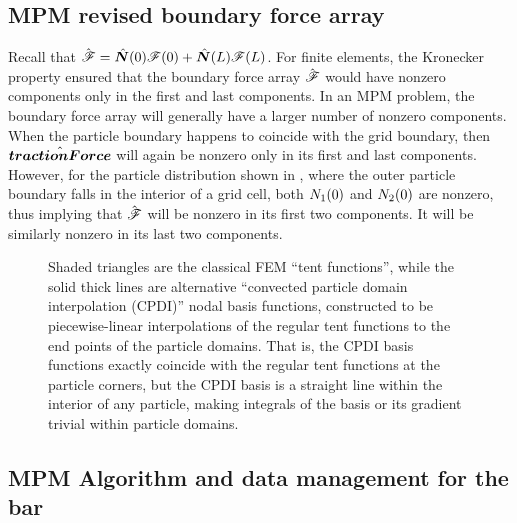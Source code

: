 \subsection{MPM revised boundary force array}
Recall that $\hat{\bm{\mathscr{F}}}=\hat{\bm{N}}(0)\mathscr{F}(0)+\hat{\bm{N}}(L)\mathscr{F}(L)$.  For finite elements, the Kronecker property ensured that the boundary force array $\hat{\bm{\mathscr{F}}}$ would have nonzero components only in the first and last components. In an MPM problem, the boundary force array will generally have a larger number of nonzero components.  When the particle boundary happens to coincide with the grid boundary, then $\hat{\bm{tractionForce}}$ will again be nonzero only in its first and last components.  However, for the particle distribution shown in , where the outer particle boundary falls in the interior of a grid cell, both ${N}_1(0)$ and ${N}_2(0)$ are nonzero, thus implying that $\hat{\bm{\mathscr{F}}}$ will be nonzero in its first two components. It will be similarly nonzero in its last two components. 



\begin{figure}
\caption{Shaded triangles are the classical FEM ``tent functions'', while the solid thick lines are alternative ``convected particle domain interpolation (CPDI)'' nodal basis functions, constructed to be piecewise-linear interpolations of the regular tent functions to the end points of the particle domains. That is, the CPDI basis functions exactly coincide with the regular tent functions at the particle corners, but the CPDI basis is a straight line within the interior of any particle, making integrals of the basis or its gradient trivial within particle domains.}
\label{fig:CPDI_shape_functions}
\end{figure}

\subsection{MPM Algorithm and data management for the \oneD bar}

